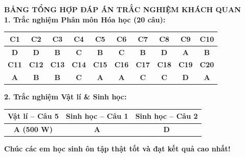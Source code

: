 \documentclass{article}
\begin{document}
\vspace*{\fill}
\newpage

\begin{center}
{\fontsize{26}{34}\selectfont \textbf{\color{brandGreen}BẢNG TỔNG HỢP ĐÁP ÁN TRẮC NGHIỆM KHÁCH QUAN}}\\[10pt]

\fontsize{20}{26}\selectfont
\textbf{1. Trắc nghiệm Phân môn Hóa học (20 câu):}\\[4pt]
\begin{tabular}{|c|c|c|c|c|c|c|c|c|c|}
\hline
\textbf{C1} & \textbf{C2} & \textbf{C3} & \textbf{C4} & \textbf{C5} & \textbf{C6} & \textbf{C7} & \textbf{C8} & \textbf{C9} & \textbf{C10} \\
\hline
\textbf{\color{brandRed}D} & \textbf{\color{brandRed}D} & \textbf{\color{brandRed}B} & \textbf{\color{brandRed}C} & \textbf{\color{brandRed}B} & \textbf{\color{brandRed}C} & \textbf{\color{brandRed}B} & \textbf{\color{brandRed}D} & \textbf{\color{brandRed}A} & \textbf{\color{brandRed}B} \\
\hline
\hline
\textbf{C11} & \textbf{C12} & \textbf{C13} & \textbf{C14} & \textbf{C15} & \textbf{C16} & \textbf{C17} & \textbf{C18} & \textbf{C19} & \textbf{C20} \\
\hline
\textbf{\color{brandRed}A} & \textbf{\color{brandRed}B} & \textbf{\color{brandRed}B} & \textbf{\color{brandRed}C} & \textbf{\color{brandRed}A} & \textbf{\color{brandRed}A} & \textbf{\color{brandRed}C} & \textbf{\color{brandRed}C} & \textbf{\color{brandRed}D} & \textbf{\color{brandRed}A} \\
\hline
\end{tabular}

\vspace{16pt}
\textbf{2. Trắc nghiệm Vật lí \& Sinh học:}\\[4pt]
\begin{tabular}{|c|c|c|}
\hline
\textbf{Vật lí -- Câu 5} & \textbf{Sinh học -- Câu 1} & \textbf{Sinh học -- Câu 2} \\
\hline
\textbf{\color{brandRed}A (500 W)} & \textbf{\color{brandRed}A} & \textbf{\color{brandRed}D} \\
\hline
\end{tabular}

\vspace{18pt}
{\fontsize{22}{28}\selectfont \textbf{\color{brandBlue}Chúc các em học sinh ôn tập thật tốt và đạt kết quả cao nhất!}}
\end{center}
\end{document}
